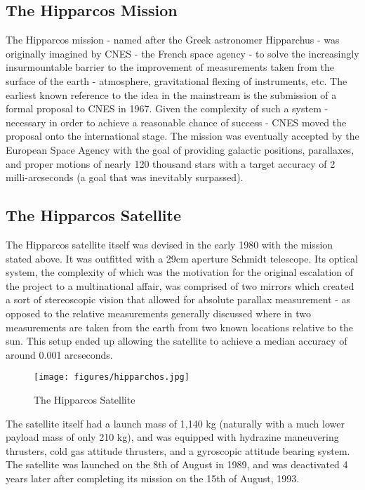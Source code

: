 \documentclass{business-covered} %
\begin{document}
		\subsection{The Hipparcos Mission}
			
			The Hipparcos mission - named after the Greek astronomer Hipparchus -  was originally imagined by CNES - the French space agency - to solve the increasingly insurmountable barrier to the improvement of measurements taken from the surface of the earth - atmosphere, gravitational flexing of instruments, etc. The earliest known reference to the idea in the mainstream is the submission of a formal proposal to CNES in 1967. Given the complexity of such a system - necessary in order to achieve a reasonable chance of success - CNES moved the proposal onto the international stage. The mission was eventually accepted by the European Space Agency with the goal of providing galactic positions, parallaxes, and proper motions of nearly 120 thousand stars with a target accuracy of 2 milli-arcseconds (a goal that was inevitably surpassed).
	
\pagebreak
		\subsection{The Hipparcos Satellite}
			The Hipparcos satellite itself was devised in the early 1980 with the mission stated above. It was outfitted with a 29cm aperture Schmidt telescope. Its optical system, the complexity of which was the motivation for the original escalation of the project to a multinational affair, was comprised of two mirrors which created a sort of stereoscopic vision that allowed for absolute parallax measurement - as opposed to the relative measurements generally discussed where in two measurements are taken from the earth from two known locations relative to the sun. This setup ended up allowing the satellite to achieve a median accuracy of around 0.001 arcseconds.
			\begin{figure}[h!]
				\centering
				\texttt{[image: figures/hipparchos.jpg]}
				\caption{The Hipparcos Satellite \cite{nasa}}
			\end{figure}
			The satellite itself had a launch mass of 1,140 kg (naturally with a much lower payload mass of only 210 kg), and was equipped with hydrazine maneuvering thrusters, cold gas attitude thrusters, and a gyroscopic attitude bearing system. The satellite was launched on the 8th of August in 1989, and was deactivated 4 years later after completing its mission on the 15th of August, 1993.
		
\end{document}
